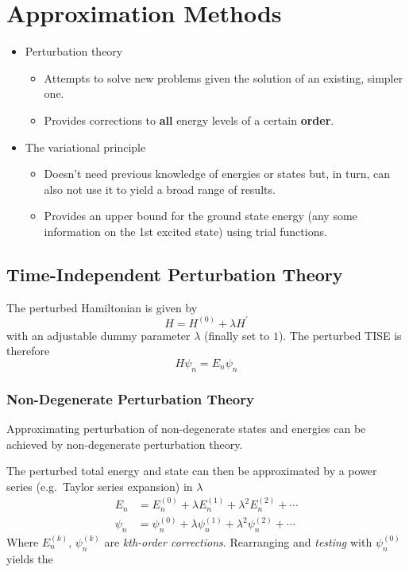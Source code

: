 \section{Approximation Methods}

\begin{itemize}
    \item Perturbation theory
    \begin{itemize}
        \item Attempts to solve new problems given the solution of an existing, simpler one.
        \item Provides corrections to \textbf{all} energy levels of a certain \textbf{order}.
    \end{itemize}
    \item The variational principle
    \begin{itemize}
        \item Doesn't need previous knowledge of energies or states but, in turn, can also not use it to yield a broad range of results.
        \item Provides an upper bound for the ground state energy (any some information on the 1st excited state) using trial functions.
    \end{itemize}
\end{itemize}

\subsection{Time-Independent Perturbation Theory}

\newpar{}

The perturbed Hamiltonian is given by
\begin{equation*}
    H=H^{(0)}+\lambda H^{\prime}
\end{equation*}
with an adjustable dummy parameter $\lambda$ (finally set to $1$). The perturbed TISE is therefore
\begin{equation*}
    H\psi_n = E_n \psi_n
\end{equation*}

\subsubsection{Non-Degenerate Perturbation Theory}
Approximating perturbation of non-degenerate states and energies can be achieved by non-degenerate perturbation theory.
\newpar{}

The perturbed total energy and state can then be approximated by a power series (e.g.\ Taylor series expansion) in $\lambda$
\begin{align*}
    E_{n}    & =E_{n}^{(0)}+\lambda E_{n}^{(1)}+\lambda^{2}E_{n}^{(2)}+\cdots         \\
    \psi_{n} & =\psi_{n}^{(0)}+\lambda\psi_{n}^{(1)}+\lambda^{2}\psi_{n}^{(2)}+\cdots
\end{align*}
Where $E_{n}^{(k)}$, $\psi_{n}^{(k)}$ are \textit{kth-order  corrections}. Rearranging and \textit{testing} with $\psi_{n}^{(0)}$ yields the

